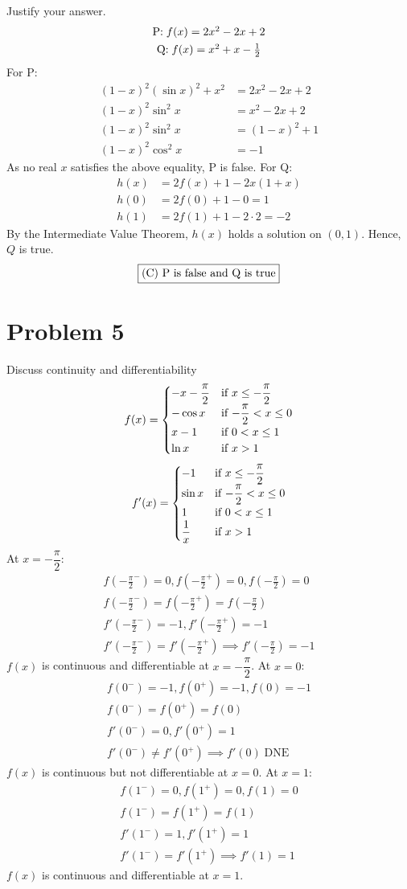 \documentclass[12pt]{article}
\newcommand{\problem}[1]{\section{Problem #1}}
\DeclareMathOperator{\dne}{DNE}
\begin{document}
Justify your answer.
\begin{gather*}
    $P$: f(x)=2x^2-2x+2\\
    $Q$:f(x)=x^2+x-\frac{1}{2}
\end{gather*}
For P:
\begin{align*}
    (1-x)^2(\sin x)^2+x^2&=2x^2-2x+2\\
    (1-x)^2\sin ^2x&=x^2-2x+2\\
    (1-x)^2\sin ^2x&=(1-x)^2+1\\
    (1-x)^2\cos^2x&=-1
\end{align*}
As no real $x$ satisfies the above equality, P is false. For Q:
\begin{align*}
    h(x)&=2f(x)+1-2x(1+x)\\
    h(0)&=2f(0)+1-0=1\\
    h(1)&=2f(1)+1-2\cdot 2=-2
\end{align*}
By the Intermediate Value Theorem, $h(x)$ holds a solution on $(0,1)$. Hence, $Q$ is true. 
\[
\boxed{$(C) P is false and Q is true$}
\]

\problem{5}
Discuss continuity and differentiability
\[
f(x)=\begin{cases}
    -x-\dfrac{\pi}{2} &$if $ x\le -\dfrac{\pi}{2}\\
    -\cos x &$if $-\dfrac{\pi}{2}<x\le 0\\
    x-1 &$if $ 0<x\le 1\\
    \ln x &$if $ x>1
\end{cases}
\]
\[
f'(x)=\begin{cases}
    -1 &$if $ x\le -\dfrac{\pi}{2}\\
    \sin x &$if $-\dfrac{\pi}{2}<x\le 0\\
    1 &$if $ 0<x\le 1\\
    \dfrac{1}{x} &$if $ x>1
\end{cases}
\]
At $x=-\dfrac{\pi}{2}$:
\begin{gather*}
    f(-\frac{\pi}{2}^-)=0,f(-\frac{\pi}{2}^+)=0,f(-\frac{\pi}{2})=0\\
    f(-\frac{\pi}{2}^-)=f(-\frac{\pi}{2}^+)=f(-\frac{\pi}{2})\\
    f'(-\frac{\pi}{2}^-)=-1,  f'(-\frac{\pi}{2}^+)=-1\\
    f'(-\frac{\pi}{2}^-)= f'(-\frac{\pi}{2}^+) \implies f'(-\frac{\pi}{2})=-1
\end{gather*}
$f(x)$ is continuous and differentiable at $x=-\dfrac{\pi}{2}$. At $x=0$:
\begin{gather*}
    f(0^-)=-1,f(0^+)=-1,f(0)=-1\\
    f(0^-)=f(0^+)=f(0)\\
    f'(0^-)=0, f'(0^+)=1\\
    f'(0^-)\ne f'(0^+) \implies f'(0)\dne 
\end{gather*}
$f(x)$ is continuous but not differentiable at $x=0$. At $x=1$:
\begin{gather*}
    f(1^-)=0, f(1^+)=0, f(1)=0\\
    f(1^-)=f(1^+)=f(1)\\
    f'(1^-)=1, f'(1^+)=1\\
    f'(1^-)=f'(1^+) \implies f'(1)=1
\end{gather*}
$f(x)$ is continuous and differentiable at $x=1$.
\end{document}
